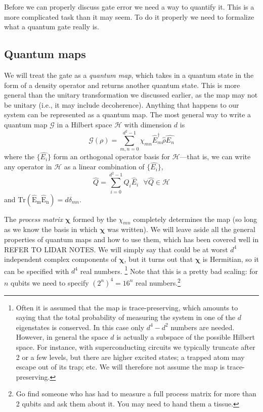 Before we can properly discuss gate error we need a way to quantify it. This is a more complicated task than it may seem. To do it properly we need to formalize what a quantum gate really is.

\subsection{Quantum maps}
We will treat the gate as a \textit{quantum map}, which takes in a quantum state in the form of a density operator and returns another quantum state. This is more general than the unitary transformation we discussed earlier, as the map may not be unitary (i.e., it may include decoherence). Anything that happens to our system can be represented as a quantum map. The most general way to write a quantum map $\mathcal{G}$ in a Hilbert space $\bm{\mathcal{H}}$ with dimension $d$ is
\begin{equation}
    \mathcal{G}(\rho) = \sum_{m,n=0}^{d^2-1}\chi_{mn}\hat{E}_m^\dag \hat{\rho} \hat{E_n}
\end{equation}
where the $\{\hat{E_i}\}$ form an orthogonal operator basis for $\bm{\mathcal{H}}$---that is, we can write any operator in $\bm{\mathcal{H}}$ as a linear combination of $\{\hat{E_i}\}$,
\begin{equation}
    \hat{Q} = \sum_{i=0}^{d^2-1}Q_i \hat{E}_i \ \ \  \forall \hat{Q} \in\bm{\mathcal{H}}
\end{equation}
and $\mathrm{Tr(\hat{E}_m\hat{E}_n)} = d\delta_{mn}$. 

The \textit{process matrix} $\bm{\chi}$ formed by the $\chi_{mn}$ completely determines the map (so long as we know the basis in which $\bm{\chi}$ was written). We will leave aside all the general properties of quantum maps and how to use them, which has been covered well in REFER TO LIDAR NOTES. We will simply say that could be at worst $d^4$ independent complex components of $\bm{\chi}$, but it turns out that $\bm{\chi}$ is Hermitian, so it can be specified with $d^4$ real numbers. \footnote{Often it is assumed that the map is trace-preserving, which amounts to saying that the total probability of measuring the system in one of the $d$ eigenstates is conserved. In this case only $d^4-d^2$ numbers are needed. However, in general the space $d$ is actually a subspace of the possible Hilbert space. For instance, with superconducting circuits we typically truncate after 2 or a few levels, but there are higher excited states; a trapped atom may escape out of its trap; etc. We will therefore not assume the map is trace-preserving.} Note that this is a pretty bad scaling: for $n$ qubits we need to specify $(2^n)^4 = 16^n$ real numbers.\footnote{Go find someone who has had to measure a full process matrix for more than 2 qubits and ask them about it. You may need to hand them a tissue.}

